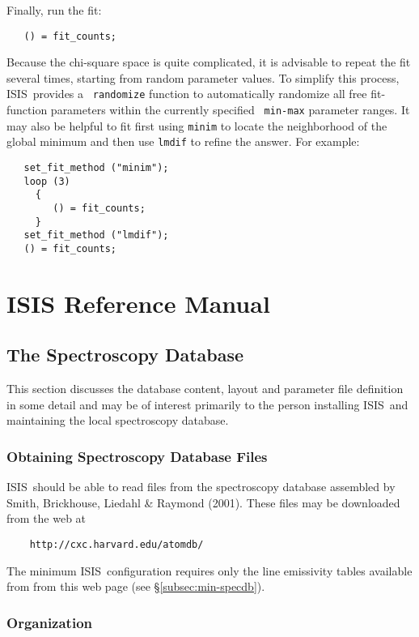 \documentclass{book}
\newcommand{\isisx}{{\sc ISIS~}}
\begin{document}
{Finally, run the fit:
\begin{verbatim}
   () = fit_counts;
\end{verbatim}

Because the chi-square space is quite complicated, it is advisable
to repeat the fit several times, starting from random parameter
values.  To simplify this process, \isisx provides a {\tt
randomize} function to automatically randomize all free
fit-function parameters within the currently specified {\tt
min-max} parameter ranges. It may also be helpful to fit first
using {\tt minim} to locate the neighborhood of the global
minimum and then use {\tt lmdif} to refine the answer.  For
example:

\begin{verbatim}
   set_fit_method ("minim");
   loop (3)
     {
        () = fit_counts;
     }
   set_fit_method ("lmdif");
   () = fit_counts;
\end{verbatim}

\part{ISIS Reference Manual \label{part:refman}}

\chapter{The Spectroscopy Database}
\label{chap:specdb}

This section discusses the database content, layout and parameter file
definition in some detail and may be of interest primarily to the person
installing \isisx and maintaining the local spectroscopy database.

\section{Obtaining Spectroscopy Database Files}

\isisx should be able to read files from the spectroscopy database assembled
by Smith, Brickhouse, Liedahl \& Raymond (2001).  These files may be
downloaded from the web at
\begin{verbatim}
    http://cxc.harvard.edu/atomdb/
\end{verbatim}
The minimum \isisx configuration requires only the line emissivity tables
available from from this web page (see \S \ref{subsec:min-specdb}).

\section{Organization}

}
\end{document}

